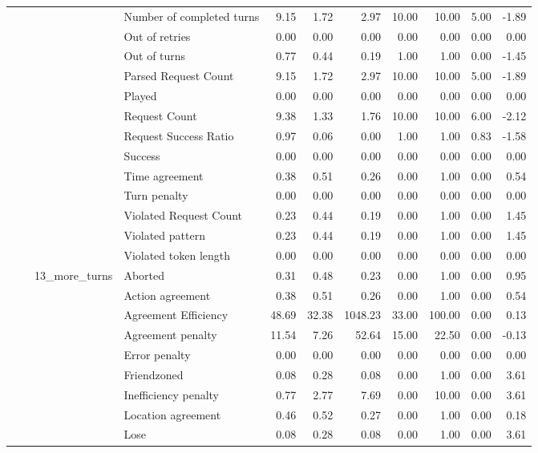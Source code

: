 \begin{tabular}{llllrrrrrrr}
 &  &  & Number of completed turns & 9.15 & 1.72 & 2.97 & 10.00 & 10.00 & 5.00 & -1.89 \\
 &  &  & Out of retries & 0.00 & 0.00 & 0.00 & 0.00 & 0.00 & 0.00 & 0.00 \\
 &  &  & Out of turns & 0.77 & 0.44 & 0.19 & 1.00 & 1.00 & 0.00 & -1.45 \\
 &  &  & Parsed Request Count & 9.15 & 1.72 & 2.97 & 10.00 & 10.00 & 5.00 & -1.89 \\
 &  &  & Played & 0.00 & 0.00 & 0.00 & 0.00 & 0.00 & 0.00 & 0.00 \\
 &  &  & Request Count & 9.38 & 1.33 & 1.76 & 10.00 & 10.00 & 6.00 & -2.12 \\
 &  &  & Request Success Ratio & 0.97 & 0.06 & 0.00 & 1.00 & 1.00 & 0.83 & -1.58 \\
 &  &  & Success & 0.00 & 0.00 & 0.00 & 0.00 & 0.00 & 0.00 & 0.00 \\
 &  &  & Time agreement & 0.38 & 0.51 & 0.26 & 0.00 & 1.00 & 0.00 & 0.54 \\
 &  &  & Turn penalty & 0.00 & 0.00 & 0.00 & 0.00 & 0.00 & 0.00 & 0.00 \\
 &  &  & Violated Request Count & 0.23 & 0.44 & 0.19 & 0.00 & 1.00 & 0.00 & 1.45 \\
 &  &  & Violated pattern & 0.23 & 0.44 & 0.19 & 0.00 & 1.00 & 0.00 & 1.45 \\
 &  &  & Violated token length & 0.00 & 0.00 & 0.00 & 0.00 & 0.00 & 0.00 & 0.00 \\
\cline{3-11}
 &  & \multirow[t]{27}{*}{13_more_turns} & Aborted & 0.31 & 0.48 & 0.23 & 0.00 & 1.00 & 0.00 & 0.95 \\
 &  &  & Action agreement & 0.38 & 0.51 & 0.26 & 0.00 & 1.00 & 0.00 & 0.54 \\
 &  &  & Agreement Efficiency & 48.69 & 32.38 & 1048.23 & 33.00 & 100.00 & 0.00 & 0.13 \\
 &  &  & Agreement penalty & 11.54 & 7.26 & 52.64 & 15.00 & 22.50 & 0.00 & -0.13 \\
 &  &  & Error penalty & 0.00 & 0.00 & 0.00 & 0.00 & 0.00 & 0.00 & 0.00 \\
 &  &  & Friendzoned & 0.08 & 0.28 & 0.08 & 0.00 & 1.00 & 0.00 & 3.61 \\
 &  &  & Inefficiency penalty & 0.77 & 2.77 & 7.69 & 0.00 & 10.00 & 0.00 & 3.61 \\
 &  &  & Location agreement & 0.46 & 0.52 & 0.27 & 0.00 & 1.00 & 0.00 & 0.18 \\
 &  &  & Lose & 0.08 & 0.28 & 0.08 & 0.00 & 1.00 & 0.00 & 3.61 \\

\end{tabular}
